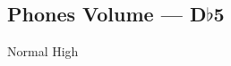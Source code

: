\subsection[Phones Volume]{Phones Volume --- \UiKey{\SET}D$\flat$5}









































Normal
High

